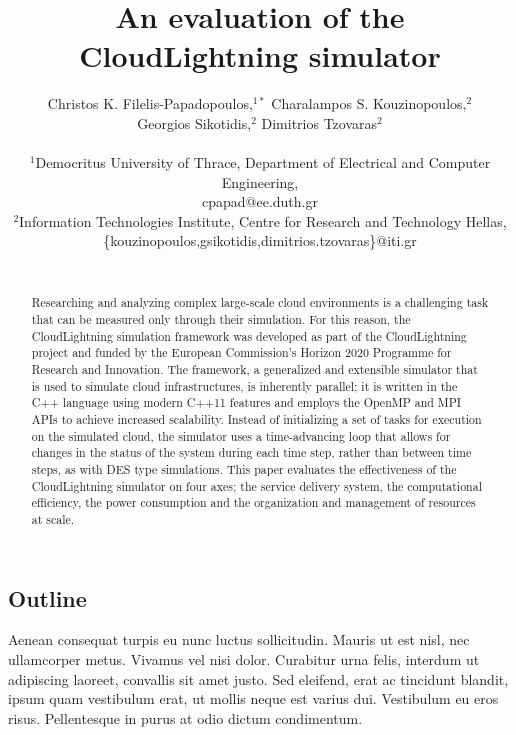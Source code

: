 \documentclass[12pt]{article}
\title{An evaluation of the CloudLightning simulator}
\author
{Christos K. Filelis-Papadopoulos,$^{1\ast}$ Charalampos S. Kouzinopoulos,$^{2}$\\
Georgios Sikotidis,$^{2}$ Dimitrios Tzovaras$^{2}$\\
\\
\normalsize{$^{1}$Democritus University of Thrace, Department of Electrical and Computer Engineering,}\\
\normalsize{cpapad@ee.duth.gr}\\
\normalsize{$^{2}$Information Technologies Institute, Centre for Research and Technology Hellas,}\\
\normalsize{\{kouzinopoulos,gsikotidis,dimitrios.tzovaras\}@iti.gr}\\
\\
}
\date{}
\begin{document}
\baselineskip18pt


\maketitle


\begin{abstract}
Researching and analyzing complex large-scale cloud environments is a challenging task that can be measured only through their simulation. For this reason, the CloudLightning simulation framework was developed as part of the CloudLightning project and funded by the European Commission’s Horizon 2020 Programme for Research and Innovation. The framework, a generalized and extensible simulator that is used to simulate cloud infrastructures, is inherently parallel; it is written in the C++ language using modern C++11 features and employs the OpenMP and MPI APIs to achieve increased scalability. Instead of initializing a set of tasks for execution on the simulated cloud, the simulator uses a time-advancing loop that allows for changes in the status of the system during each time step, rather than between time steps, as with DES type simulations. This paper evaluates the effectiveness of the CloudLightning simulator on four axes; the service delivery system, the computational efficiency, the power consumption and the organization and management of resources at scale.
\end{abstract}














\subsection{Outline}

Aenean consequat turpis eu nunc luctus sollicitudin. Mauris ut est nisl, nec ullamcorper metus. Vivamus vel nisi dolor. Curabitur urna felis, interdum ut adipiscing laoreet, convallis sit amet justo. Sed eleifend, erat ac tincidunt blandit, ipsum quam vestibulum erat, ut mollis neque est varius dui. Vestibulum eu eros risus. Pellentesque in purus at odio dictum condimentum.
\end{document}
